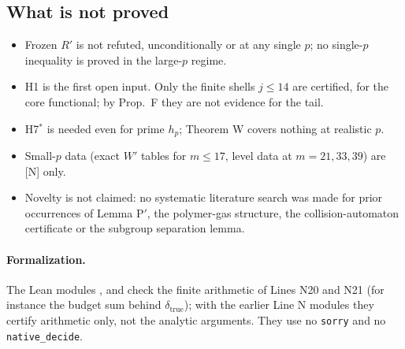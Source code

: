 \subsection{What is not proved}
\label{sec:lines-I-N-limits}
\begin{itemize}
\item Frozen \(R'\) is not refuted, unconditionally or at any single \(p\); no single-\(p\) inequality is proved in the large-\(p\) regime.
\item H1 is the first open input. Only the finite shells \(j\le14\) are certified, for the core functional; by Prop.~F they are not evidence for the tail.
\item H7\(^*\) is needed even for prime \(h_p\); Theorem W covers nothing at realistic \(p\).
\item Small-\(p\) data (exact \(W'\) tables for \(m\le17\), level data at \(m=21,33,39\)) are [N] only.
\item Novelty is not claimed: no systematic literature search was made for prior occurrences of Lemma P\('\), the polymer-gas structure, the collision-automaton certificate or the subgroup separation lemma.
\end{itemize}

\paragraph{Formalization.} The Lean modules ,  and  check the finite arithmetic of Lines N20 and N21 (for instance the budget sum behind \(\delta_{\mathrm{true}}\)); with the earlier Line N modules they certify arithmetic only, not the analytic arguments. They use no \texttt{sorry} and no \texttt{native\_decide}.
